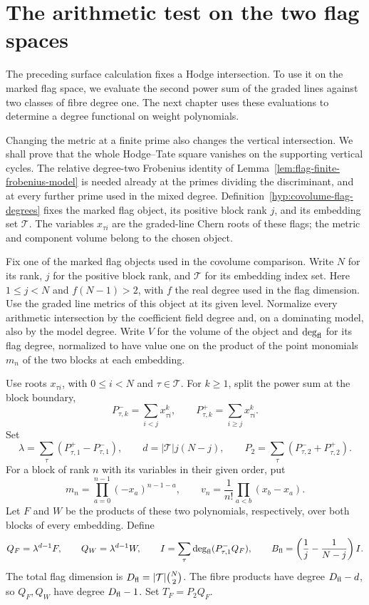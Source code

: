 \section{The arithmetic test on the two flag spaces}
\label{sec:covolume-flag-test}

The preceding surface calculation fixes a Hodge intersection. To use it on the marked flag space, we evaluate the second power sum of the graded lines against two classes of fibre degree one. The next chapter uses these evaluations to determine a degree functional on weight polynomials.

Changing the metric at a finite prime also changes the vertical intersection. We shall prove that the whole Hodge--Tate square vanishes on the supporting vertical cycles. The relative degree-two Frobenius identity of Lemma~\ref{lem:flag-finite-frobenius-model} is needed already at the primes dividing the discriminant, and at every further prime used in the mixed degree.
Definition~\ref{hyp:covolume-flag-degrees} fixes the marked flag object,
its positive block rank \(j\), and its embedding set \(\mathcal T\).
The variables \(x_{\tau i}\) are the graded-line Chern roots of these
flags; the metric and component volume belong to the chosen object.

\begin{paramdefinition}\label{hyp:covolume-flag-degrees}
Fix one of the marked flag objects used in the covolume
comparison. Write \(N\) for its rank, \(j\) for the positive
block rank, and \(\mathcal T\) for its embedding index set.
Here \(1\le j<N\) and \(f(N-1)>2\), with \(f\) the real
degree used in the flag dimension. Use the graded line
metrics of this object at its given level. Normalize every arithmetic intersection by the coefficient field degree and, on a dominating model, also by the model degree. Write \(V\) for the volume of the
object and \(\deg_{\rm fl}\) for its flag degree, normalized to have value one on the product of the point monomials \(m_n\) of the two blocks at each embedding.
\label{cor:covolume-flag-test-1}

Use roots \(x_{\tau i}\), with \(0\le i<N\) and \(\tau\in
\mathcal T\). For \(k\ge1\), split the power sum at the block boundary,
\[
 P^-_{\tau,k}=\sum_{i<j}x_{\tau i}^{k},\qquad P^+_{\tau,k}=\sum_{i\ge j}x_{\tau i}^{k}.
\]
Set
\[
 \lambda=\sum_\tau(P^+_{\tau,1}-P^-_{\tau,1}),\qquad
 d=|\mathcal T|j(N-j),\qquad
 P_2=\sum_\tau(P^-_{\tau,2}+P^+_{\tau,2}).
\]
For a block of rank \(n\) with its variables in their
given order, put
\[
 m_n=\prod_{a=0}^{n-1}(-x_a)^{n-1-a},\qquad
 v_n=\frac{1}{n!}\prod_{a<b}(x_b-x_a).
\]
Let \(F\) and \(W\) be the products of these two polynomials,
respectively, over both blocks of every embedding. Define
\[
 Q_F=\lambda^{d-1}F,\qquad Q_W=\lambda^{d-1}W,\qquad
 I=\sum_\tau\deg_{\rm fl}(P^-_{\tau,1}Q_F),\qquad
 B_{\rm fl}=\left(\frac1j-\frac1{N-j}\right)I.
\]
The total flag dimension is \(D_{\rm fl}=|\mathcal T|\binom N2\).
The fibre products have degree \(D_{\rm fl}-d\), so \(Q_F,Q_W\)
have degree \(D_{\rm fl}-1\). Set \(T_F=P_2Q_F\).
\end{paramdefinition}

